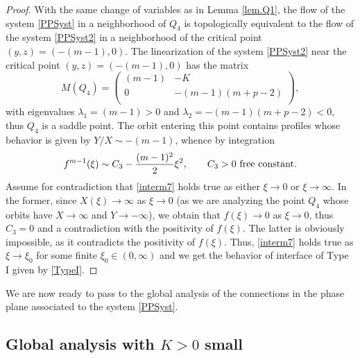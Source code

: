 \documentclass[a4paper,11pt]{article}
\numberwithin{equation}{section}
\begin{document}
\begin{proof}
With the same change of variables as in Lemma \ref{lem.Q1}, the flow of the system \eqref{PPSyst} in a neighborhood of $Q_4$ is topologically equivalent to the flow of the system \eqref{PPSyst2} in a neighborhood of the critical point $(y,z)=(-(m-1),0)$. The linearization of the system \eqref{PPSyst2} near the critical point $(y,z)=(-(m-1),0)$ has the matrix
$$M(Q_4)=\left(
  \begin{array}{cc}
    (m-1) & -K \\
    0 & -(m-1)(m+p-2)\\
  \end{array}
\right),$$
with eigenvalues $\lambda_1=(m-1)>0$ and $\lambda_2=-(m-1)(m+p-2)<0$, thus $Q_4$ is a saddle point. The orbit entering this point contains profiles whose behavior is given by $Y/X\sim-(m-1)$, whence by integration
\begin{equation}\label{interm7}
f^{m-1}(\xi)\sim C_3-\frac{(m-1)^2}{2}\xi^2, \qquad C_3>0 \ {\rm free \ constant}.
\end{equation}
Assume for contradiction that \eqref{interm7} holds true as either $\xi\to0$ or $\xi\to\infty$. In the former, since $X(\xi)\to\infty$ as $\xi\to0$ (as we are analyzing the point $Q_4$ whose orbits have $X\to\infty$ and $Y\to-\infty$), we obtain that $f(\xi)\to0$ as $\xi\to0$, thus $C_3=0$ and a contradiction with the positivity of $f(\xi)$. The latter is obviously impossible, as it contradicts the positivity of $f(\xi)$. Thus, \eqref{interm7} holds true as $\xi\to\xi_0$ for some finite $\xi_0\in(0,\infty)$ and we get the behavior of interface of Type I given by \eqref{TypeI}.
\end{proof}
We are now ready to pass to the global analysis of the connections in the phase plane associated to the system \eqref{PPSyst}.

\subsection{Global analysis with $K>0$ small}\label{subsec.small}
\end{document}
